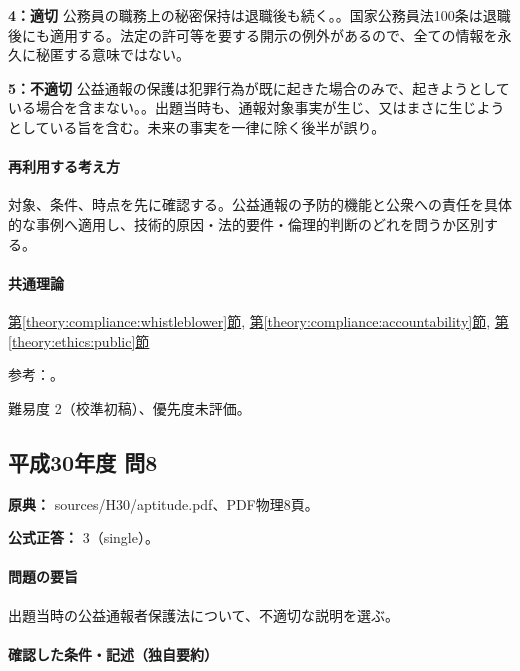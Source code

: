 \noindent\textbf{4：適切} 公務員の職務上の秘密保持は退職後も続く。。国家公務員法100条は退職後にも適用する。法定の許可等を要する開示の例外があるので、全ての情報を永久に秘匿する意味ではない。\par

\noindent\textbf{5：不適切} 公益通報の保護は犯罪行為が既に起きた場合のみで、起きようとしている場合を含まない。。出題当時も、通報対象事実が生じ、又はまさに生じようとしている旨を含む。未来の事実を一律に除く後半が誤り。\par

\paragraph{再利用する考え方} 対象、条件、時点を先に確認する。公益通報の予防的機能と公衆への責任を具体的な事例へ適用し、技術的原因・法的要件・倫理的判断のどれを問うか区別する。

\paragraph{共通理論} \hyperref[theory:compliance:whistleblower]{第\ref*{theory:compliance:whistleblower}節}, \hyperref[theory:compliance:accountability]{第\ref*{theory:compliance:accountability}節}, \hyperref[theory:ethics:public]{第\ref*{theory:ethics:public}節}

\par 参考：\cite{caa_handbook_pre2022,caa_report_current,jp_constitution,jp_civil,jp_national_public}。

\par 難易度 2（校準初稿）、優先度未評価。

\subsection{平成30年度 問8}
\label{q:h30-reg-apt-08}

\noindent\textbf{原典：} sources/H30/aptitude.pdf、PDF物理8頁。

\textbf{公式正答：} 3（single）。

\paragraph{問題の要旨} 出題当時の公益通報者保護法について、不適切な説明を選ぶ。

\paragraph{確認した条件・記述（独自要約）}\mbox{}\par

